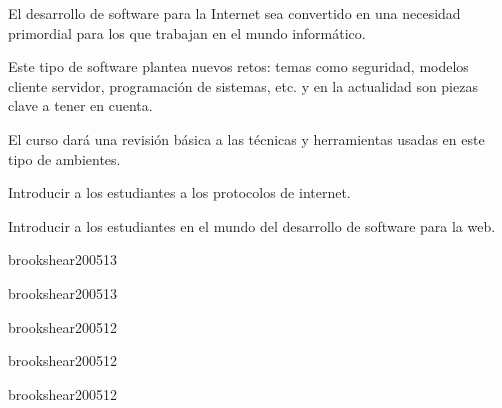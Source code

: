 \begin{syllabus}


\begin{justification}
El desarrollo de software para la Internet sea convertido en una necesidad primordial para los que trabajan en el mundo informático.

Este tipo de software plantea nuevos retos: temas como seguridad, modelos cliente servidor, programación de sistemas, etc. y en la actualidad son piezas clave a tener en cuenta.

El curso dará una revisión básica a las técnicas y herramientas usadas en este tipo de ambientes.
\end{justification}

\begin{goals}
\item Introducir a los estudiantes a los protocolos de internet.
\item Introducir a los estudiantes en el mundo del desarrollo de software para la web.
\end{goals}

\begin{outcomes}
\end{outcomes}

\begin{unit}{\NCIntroductionDef}{brookshear2005}{1}{3}
   \NCIntroductionAllTopics
   \NCIntroductionAllObjectives
\end{unit}

\begin{unit}{\NCNetworkCommunicationDef}{brookshear2005}{1}{3}
   \NCNetworkCommunicationAllTopics
   \NCNetworkCommunicationAllObjectives
\end{unit}

\begin{unit}{\NCNetworkSecurityDef}{brookshear2005}{1}{2}
   \NCNetworkSecurityAllTopics
   \NCNetworkSecurityAllObjectives
\end{unit}

\begin{unit}{\NCCompressionDef}{brookshear2005}{1}{2}
   \NCCompressionAllTopics
   \NCCompressionAllObjectives
\end{unit}

\begin{unit}{\NCNetworkManagementDef}{brookshear2005}{1}{2}
   \NCNetworkManagementAllTopics
   \NCNetworkManagementAllObjectives
\end{unit}


\end{syllabus}
